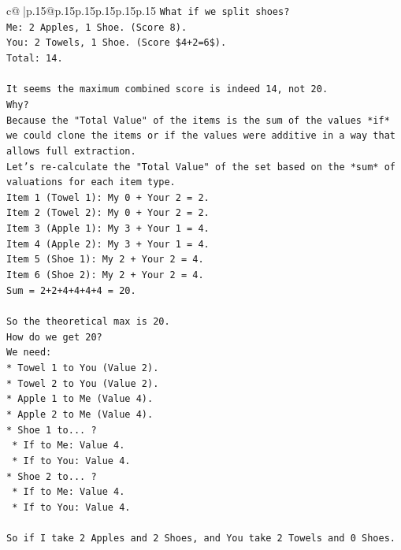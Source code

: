 \documentclass{article}
\begin{document}
{\begin{supertabular}{c@{$\;$}|p{.15\linewidth}@{}p{.15\linewidth}p{.15\linewidth}p{.15\linewidth}p{.15\linewidth}p{.15\linewidth}}
{{{\texttt{What if we split shoes?} \\
\texttt{Me: 2 Apples, 1 Shoe. (Score 8).} \\
\texttt{You: 2 Towels, 1 Shoe. (Score \$4+2=6\$).} \\
\texttt{Total: 14.} \\
\\ 
\texttt{It seems the maximum combined score is indeed 14, not 20.} \\
\texttt{Why?} \\
\texttt{Because the "Total Value" of the items is the sum of the values *if* we could clone the items or if the values were additive in a way that allows full extraction.} \\
\texttt{Let's re{-}calculate the "Total Value" of the set based on the *sum* of valuations for each item type.} \\
\texttt{Item 1 (Towel 1): My 0 + Your 2 = 2.} \\
\texttt{Item 2 (Towel 2): My 0 + Your 2 = 2.} \\
\texttt{Item 3 (Apple 1): My 3 + Your 1 = 4.} \\
\texttt{Item 4 (Apple 2): My 3 + Your 1 = 4.} \\
\texttt{Item 5 (Shoe 1): My 2 + Your 2 = 4.} \\
\texttt{Item 6 (Shoe 2): My 2 + Your 2 = 4.} \\
\texttt{Sum = 2+2+4+4+4+4 = 20.} \\
\\ 
\texttt{So the theoretical max is 20.} \\
\texttt{How do we get 20?} \\
\texttt{We need:} \\
\texttt{*   Towel 1 to You (Value 2).} \\
\texttt{*   Towel 2 to You (Value 2).} \\
\texttt{*   Apple 1 to Me (Value 4).} \\
\texttt{*   Apple 2 to Me (Value 4).} \\
\texttt{*   Shoe 1 to... ?} \\
\texttt{    *   If to Me: Value 4.} \\
\texttt{    *   If to You: Value 4.} \\
\texttt{*   Shoe 2 to... ?} \\
\texttt{    *   If to Me: Value 4.} \\
\texttt{    *   If to You: Value 4.} \\
\\ 
\texttt{So if I take 2 Apples and 2 Shoes, and You take 2 Towels and 0 Shoes.} \\
}}}
\end{supertabular}}
\end{document}
